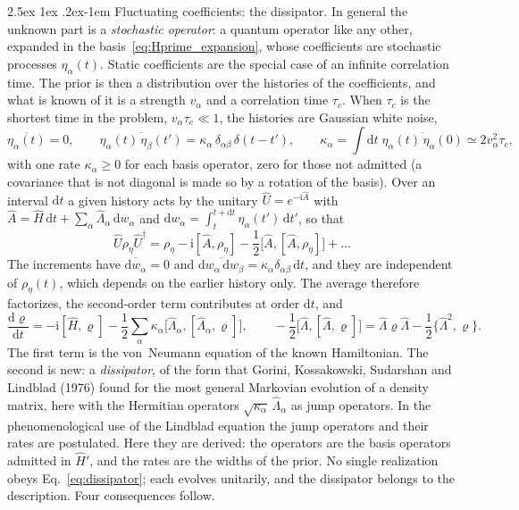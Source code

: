 \documentclass[10pt,a4paper]{article}
\makeatletter
\renewcommand{\paragraph}{\@startsection{paragraph}{4}{\z@}%
  {2.5ex \@plus 1ex \@minus .2ex}{-1em}%
  {\normalfont\fontsize{14pt}{17pt}\selectfont\bfseries}}
\newcommand{\dd}{\mathrm{d}}
\newcommand{\ii}{\mathrm{i}}
\makeatother
\begin{document}
\paragraph{Fluctuating coefficients: the dissipator.}
In general the unknown part is a \emph{stochastic operator}: a quantum operator like any other, expanded in the basis~\eqref{eq:Hprime_expansion}, whose coefficients are stochastic processes $ \eta_\alpha(t) $.
Static coefficients are the special case of an infinite correlation time.
The prior is then a distribution over the histories of the coefficients, and what is known of it is a strength $ v_\alpha $ and a correlation time $ \tau_c $.
When $ \tau_c $ is the shortest time in the problem, $ v_\alpha\tau_c \ll 1 $, the histories are Gaussian white noise,
\[
  \overline{\eta_\alpha(t)} = 0 , \qquad
  \overline{\eta_\alpha(t)\,\eta_\beta(t')} = \kappa_\alpha\,\delta_{\alpha\beta}\,\delta(t - t') ,
  \qquad \kappa_\alpha = \int\!\dd t\;\overline{\eta_\alpha(t)\,\eta_\alpha(0)} \simeq 2v_\alpha^{2}\tau_c ,
\]
with one rate $ \kappa_\alpha \geq 0 $ for each basis operator, zero for those not admitted (a covariance that is not diagonal is made so by a rotation of the basis).
Over an interval $ \dd t $ a given history acts by the unitary $ \hat U = e^{-\ii \hat A} $ with $ \hat A = \hat H\,\dd t + \sum_\alpha\hat\Lambda_\alpha\,\dd w_\alpha $ and $ \dd w_\alpha = \int_t^{t + \dd t}\eta_\alpha(t')\,\dd t' $, so that
\[
  \hat U\rho_\eta\hat U^\dagger = \rho_\eta - \ii[\hat A, \rho_\eta]
  - \frac{1}{2}\big[\hat A, [\hat A, \rho_\eta]\big] + \dots
\]
The increments have $ \overline{\dd w_\alpha} = 0 $ and $ \overline{\dd w_\alpha\,\dd w_\beta} = \kappa_\alpha\delta_{\alpha\beta}\,\dd t $, and they are independent of $ \rho_\eta(t) $, which depends on the earlier history only.
The average therefore factorizes, the second-order term contributes at order $ \dd t $, and
\begin{equation}\label{eq:dissipator}
  \frac{\dd\varrho}{\dd t} = -\ii[\hat H, \varrho]
  - \frac{1}{2}\sum_\alpha\kappa_\alpha\big[\hat\Lambda_\alpha, [\hat\Lambda_\alpha, \varrho]\big] ,
  \qquad
  -\frac{1}{2}\big[\hat\Lambda, [\hat\Lambda, \varrho]\big]
  = \hat\Lambda\varrho\hat\Lambda - \frac{1}{2}\big\{\hat\Lambda^{2}, \varrho\big\} .
\end{equation}
The first term is the von~Neumann equation of the known Hamiltonian.
The second is new: a \emph{dissipator}, of the form that Gorini, Kossakowski, Sudarshan and Lindblad (1976) found for the most general Markovian evolution of a density matrix, here with the Hermitian operators $ \sqrt{\kappa_\alpha}\,\hat\Lambda_\alpha $ as jump operators.
In the phenomenological use of the Lindblad equation the jump operators and their rates are postulated.
Here they are derived: the operators are the basis operators admitted in $ \hat H' $, and the rates are the widths of the prior.
No single realization obeys Eq.~\eqref{eq:dissipator}; each evolves unitarily, and the dissipator belongs to the description.
Four consequences follow.
\end{document}
